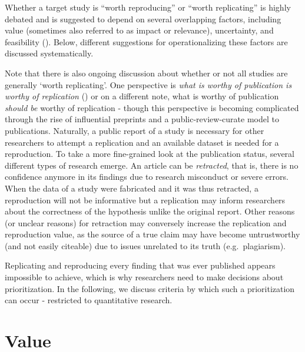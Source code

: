 \documentclass[
  letterpaper,
  DIV=11,
  openany,
  fontsize=12pt,
  parskip=half,
  headings=big,
  numbers=noenddot,
  titlepage=false]{scrreprt}
\begin{document}
Whether a target study is ``worth reproducing'' or ``worth replicating''
is highly debated and is suggested to depend on several overlapping
factors, including value (sometimes also referred to as impact or
relevance), uncertainty, and feasibility
(). Below,
different suggestions for operationalizing these factors are discussed
systematically.

Note that there is also ongoing discussion about whether or not all
studies are generally `worth replicating'. One perspective is \emph{what
is worthy of publication is worthy of replication}
() or on a different note, what
is worthy of publication \emph{should be }worthy of replication - though
this perspective is becoming complicated through the rise of influential
preprints and a public-review-curate model to publications. Naturally, a
public report of a study is necessary for other researchers to attempt a
replication and an available dataset is needed for a reproduction. To
take a more fine-grained look at the publication status, several
different types of research emerge. An article can be \emph{retracted},
that is, there is no confidence anymore in its findings due to research
misconduct or severe errors. When the data of a study were fabricated
and it was thus retracted, a reproduction will not be informative but a
replication may inform researchers about the correctness of the
hypothesis unlike the original report. Other reasons (or unclear
reasons) for retraction may conversely increase the replication and
reproduction value, as the source of a true claim may have become
untrustworthy (and not easily citeable) due to issues unrelated to its
truth (e.g.~plagiarism).

Replicating and reproducing every finding that was ever published
appears impossible to achieve, which is why researchers need to make
decisions about prioritization. In the following, we discuss criteria by
which such a prioritization can occur - restricted to quantitative
research.

\section{Value}\label{value}
\end{document}

